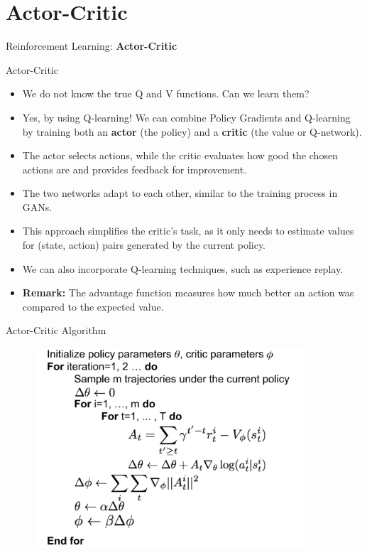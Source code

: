 \section{Actor-Critic}
\begin{frame}{}
    \LARGE Reinforcement Learning: \textbf{Actor-Critic}
\end{frame}

\begin{frame}{Actor-Critic}
    \begin{itemize}
        \item We do not know the true Q and V functions. Can we learn them?
        \pause
        \item Yes, by using Q-learning! We can combine Policy Gradients and Q-learning by training both an \textbf{actor} (the policy) and a \textbf{critic} (the value or Q-network).
        \pause
        \item The actor selects actions, while the critic evaluates how good the chosen actions are and provides feedback for improvement.
        \item The two networks adapt to each other, similar to the training process in GANs.
        \pause
        \item This approach simplifies the critic's task, as it only needs to estimate values for (state, action) pairs generated by the current policy.
        \item We can also incorporate Q-learning techniques, such as experience replay.
        \pause
        \item \textbf{Remark:} The advantage function measures how much better an action was compared to the expected value.
    \end{itemize}
\end{frame}

\begin{frame}{Actor-Critic Algorithm}
    \begin{figure}
        \centering
        \includegraphics[width=0.9\textwidth,height=0.9\textheight,keepaspectratio]{images/policygrad+reinforce+actor/a2c.png}
    \end{figure}
\end{frame}
